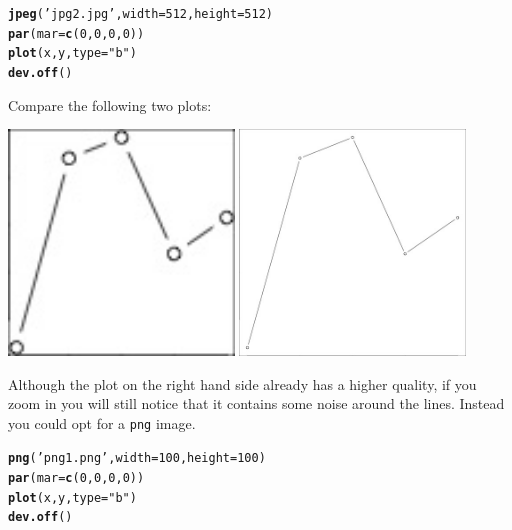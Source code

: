 \documentclass[12pt,a4paper]{article}\usepackage[]{graphicx}\usepackage[]{color}
\makeatletter
\newcommand{\hlnum}[1]{\textcolor[rgb]{0.686,0.059,0.569}{#1}}%
\newcommand{\hlstr}[1]{\textcolor[rgb]{0.192,0.494,0.8}{#1}}%
\newcommand{\hlstd}[1]{\textcolor[rgb]{0.345,0.345,0.345}{#1}}%
\newcommand{\hlkwc}[1]{\textcolor[rgb]{0.333,0.667,0.333}{#1}}%
\newcommand{\hlkwd}[1]{\textcolor[rgb]{0.737,0.353,0.396}{\textbf{#1}}}%
\newenvironment{kframe}{%
 \def\at@end@of@kframe{}%
 \ifinner\ifhmode%
  \def\at@end@of@kframe{\end{minipage}}%
  \begin{minipage}{\columnwidth}%
 \fi\fi%
 \def\FrameCommand##1{\hskip\@totalleftmargin \hskip-\fboxsep
 \colorbox{shadecolor}{##1}\hskip-\fboxsep
     \hskip-\linewidth \hskip-\@totalleftmargin \hskip\columnwidth}%
 \MakeFramed {\advance\hsize-\width
   \@totalleftmargin\z@ \linewidth\hsize
   \@setminipage}}%
 {\par\unskip\endMakeFramed%
 \at@end@of@kframe}
\newenvironment{knitrout}{}{} %
\makeatother
\begin{document}
\begin{mdframed}
\begin{knitrout}
\begin{kframe}
\begin{alltt}
\hlkwd{jpeg}\hlstd{(}\hlstr{'jpg2.jpg'}\hlstd{,}\hlkwc{width}\hlstd{=}\hlnum{512}\hlstd{,}\hlkwc{height}\hlstd{=}\hlnum{512}\hlstd{)}
\hlkwd{par}\hlstd{(}\hlkwc{mar}\hlstd{=}\hlkwd{c}\hlstd{(}\hlnum{0}\hlstd{,}\hlnum{0}\hlstd{,}\hlnum{0}\hlstd{,}\hlnum{0}\hlstd{))}
\hlkwd{plot}\hlstd{(x,y,}\hlkwc{type}\hlstd{=}\hlstr{"b"}\hlstd{)}
\hlkwd{dev.off}\hlstd{()}
\end{alltt}
\end{kframe}
\end{knitrout}
Compare the following two plots:
\begin{center}
\includegraphics[width=0.45\textwidth]{jpg1.jpg}
\includegraphics[width=0.45\textwidth]{jpg2.jpg}
\end{center}
Although the plot on the right hand side already has a higher quality, if you zoom in you will still notice that it contains some noise around the lines. Instead you could opt for a \texttt{png} image.
\begin{knitrout}
\color{fgcolor}\begin{kframe}
\begin{alltt}
\hlkwd{png}\hlstd{(}\hlstr{'png1.png'}\hlstd{,}\hlkwc{width}\hlstd{=}\hlnum{100}\hlstd{,}\hlkwc{height}\hlstd{=}\hlnum{100}\hlstd{)}
\hlkwd{par}\hlstd{(}\hlkwc{mar}\hlstd{=}\hlkwd{c}\hlstd{(}\hlnum{0}\hlstd{,}\hlnum{0}\hlstd{,}\hlnum{0}\hlstd{,}\hlnum{0}\hlstd{))}
\hlkwd{plot}\hlstd{(x,y,}\hlkwc{type}\hlstd{=}\hlstr{"b"}\hlstd{)}
\hlkwd{dev.off}\hlstd{()}


\end{alltt}
\end{kframe}
\end{knitrout}
\end{mdframed}
\end{document}
